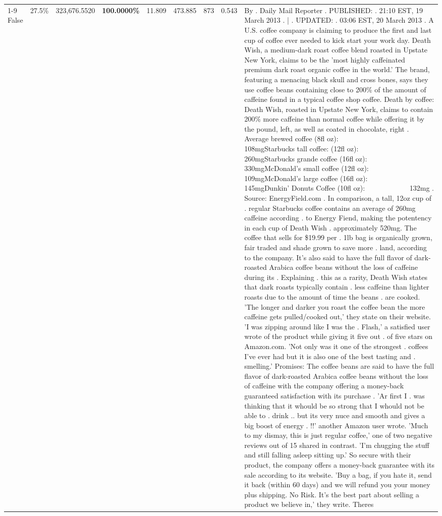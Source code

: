 \begin{table}[H]
{\begin{tabular}{lllrlllll}
\cline{1-9}
False & 27.5\% & 323,676.5520 & \bfseries \color{red} 100.0000\% & 11.809 & 473.885 & 873 & 0.543 & By . Daily Mail Reporter . PUBLISHED: . 21:10 EST, 19 March 2013 . | . UPDATED: . 03:06 EST, 20 March 2013 . A U.S. coffee company is claiming to produce the first and last cup of coffee ever needed to kick start your work day. Death Wish, a medium-dark roast coffee blend roasted in Upstate New York, claims to be the 'most highly caffeinated premium dark roast organic coffee in the world.' The brand, featuring a menacing black skull and cross bones, says they use coffee beans containing close to 200\% of the amount of caffeine found in a typical coffee shop coffee. Death by coffee: Death Wish, roasted in Upstate New York, claims to contain 200\% more caffeine than normal coffee while offering it by the pound, left, as well as coated in chocolate, right . Average brewed coffee (8fl oz):              108mgStarbucks tall coffee: (12fl oz):                260mgStarbucks grande coffee (16fl oz):         330mgMcDonald's small coffee (12fl oz):           109mgMcDonald's large coffee (16fl oz):           145mgDunkin' Donuts Coffee (10fl oz):             132mg . Source: EnergyField.com . In comparison, a tall, 12oz cup of . regular Starbucks coffee contains an average of 260mg caffeine according . to Energy Fiend, making the potentency in each cup of Death Wish . approximately 520mg. The coffee that sells for \$19.99 per . 1lb bag is organically grown, fair traded and shade grown to save more . land, according to the company. It's also said to have the full flavor of dark-roasted Arabica coffee beans without the loss of caffeine during its . Explaining . this as a rarity, Death Wish states that dark roasts typically contain . less caffeine than lighter roasts due to the amount of time the beans . are cooked. 'The longer and darker you roast the coffee bean the more caffeine gets pulled/cooked out,' they state on their website. 'I was zipping around like I was the . Flash,' a satisfied user wrote of the product while giving it five out . of five stars on Amazon.com. 'Not only was it one of the strongest . coffees I've ever had but it is also one of the best tasting and . smelling.’ Promises: The coffee beans are said to have the full flavor of dark-roasted Arabica coffee beans without the loss of caffeine with the company offering a money-back guaranteed satisfaction with its purchase . 'Ar first I . was thinking that it whould be so strong that I whould not be able to . drink .. but its very nuce and smooth and gives a big boost of energy . !!' another Amazon user wrote. 'Much to my dismay, this is just regular coffee,' one of two negative reviews out of 15 shared in contrast. 'I'm chugging the stuff and still falling asleep sitting up.' So secure with their product, the company offers a money-back guarantee with its sale according to its website. 'Buy a bag, if you hate it, send it back (within 60 days) and we will refund you your money plus shipping. No Risk. It’s the best part about selling a product we believe in,' they write. Theres \\

\end{tabular}}
\end{table}
